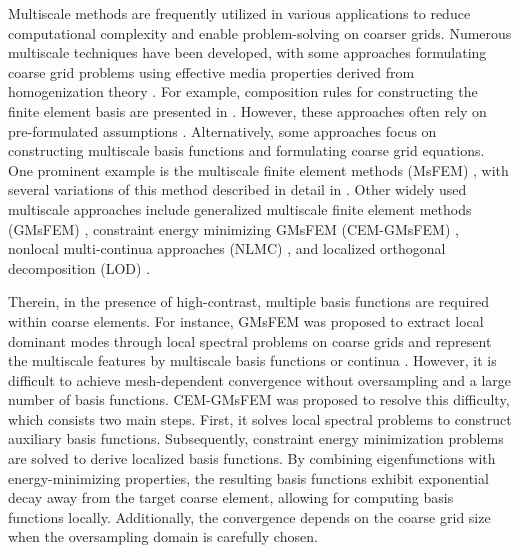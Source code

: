 \documentclass[preprint,12pt]{elsarticle}
\begin{document}
Multiscale methods are frequently utilized in various applications to reduce computational complexity and enable problem-solving on coarser grids. Numerous multiscale techniques have been developed, with some approaches formulating coarse grid problems using effective media properties derived from homogenization theory \cite{wu2002analysis,chung2018constraint,bourgeat1984homogenized,efendiev2003numerical}. For example, composition rules for constructing the finite element basis are presented in \cite{allaire2005multiscale}. However, these approaches often rely on pre-formulated assumptions \cite{durlofsky1991numerical,bakhvalov2012homogenisation}.
Alternatively, some approaches focus on constructing multiscale basis functions and formulating coarse grid equations. 
One prominent example is the multiscale finite element methods (MsFEM) \cite{jenny2003multi,chen2002multiscale,hou1999convergence}, with several variations of this method described in detail in \cite{efendiev2009multiscale}.
Other widely used multiscale approaches include generalized multiscale finite element methods (GMsFEM) \cite{efendiev2013generalized,chung2014adaptive,chung2016goal},
constraint energy minimizing GMsFEM (CEM-GMsFEM) \cite{chung2018constraint,chung2022contrast,cheung2018constraint},
nonlocal multi-continua approaches (NLMC) \cite{chung2018non,leung2022multirate,wang2023adaptive}, and localized orthogonal decomposition (LOD) \cite{henning2014localized,zhang2022combined}. 

Therein, in the presence of high-contrast, multiple basis functions are required within coarse elements. For instance, GMsFEM was proposed to extract local dominant modes through local spectral problems on coarse grids and represent the multiscale features by multiscale basis functions or continua \cite{efendiev2013generalized}. However, it is difficult to achieve mesh-dependent convergence without oversampling and a large number of basis functions.
CEM-GMsFEM was proposed to resolve this difficulty, which consists two main steps. First, it solves local spectral problems to construct auxiliary basis functions. Subsequently, constraint energy minimization problems are solved to derive localized basis functions. By combining eigenfunctions with energy-minimizing properties, the resulting basis functions exhibit exponential decay away from the target coarse element, allowing for computing basis functions locally. Additionally, the convergence depends on the coarse grid size when the oversampling domain is carefully chosen.
\end{document}
